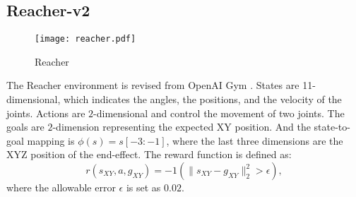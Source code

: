 \documentclass{article}
\begin{document}
\subsection{Reacher-v2}
\begin{wrapfigure}{r}{2.3cm}
\centering
  \vspace{-10pt}    %
  \texttt{[image: reacher.pdf]}\\
  \vspace{-0pt}    %
  \caption*{Reacher}
  \vspace{-8pt}    %
\end{wrapfigure}
The Reacher environment is revised from OpenAI Gym \cite{brockman2016openai}. States are 11-dimensional, which indicates the angles, the positions, and the velocity of the joints. Actions are $2$-dimensional and control the movement of two joints. The goals are $2$-dimension representing the expected XY position. And the state-to-goal mapping is $\phi(s)=s[-3:-1]$, where the last three dimensions are the XYZ position of the end-effect. The reward function is defined as:
\begin{equation*}
    r(s_{XY},a,g_{XY}) = - 1(\|s_{XY}-g_{XY} \|_2^2 > \epsilon),
\end{equation*}
where the allowable error $\epsilon$ is set as $0.02$.
\end{document}
